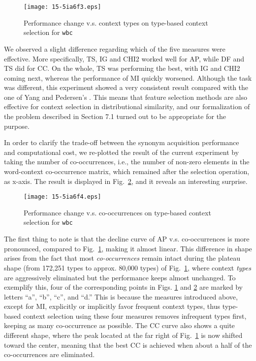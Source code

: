 \documentclass[english]{jnlp_1.4}
\begin{document}
\begin{figure}[b]
\begin{center}
\texttt{[image: 15-5ia6f3.eps]}
\end{center}
\caption{Performance change v.s. context types on type-based context selection for {\tt wbc}}
\label{fig_typeres_wbc}
\end{figure}

We observed a slight difference regarding which of the five measures
were effective. More specifically, TS, IG and CHI2 worked well for AP,
while DF and TS did for CC. On the whole, TS was performing the best,
with IG and CHI2 coming next, whereas the performance of MI quickly
worsened. Although the task was different, this experiment showed a
very consistent result compared with the one of Yang and Pedersen's
\cite{Yang:97}. This means that feature selection methods are also
effective for context selection in distributional similarity, and our
formalization of the problem described in Section 7.1 turned out to be
appropriate for the purpose.


In order to clarify the trade-off between the synonym acquisition
performance and computational cost, we re-plotted the result of the
current experiment by taking the number of co-occurrences, i.e., the
number of non-zero elements in the word-context co-occurrence matrix,
which remained after the selection operation, as x-axis. The result is
displayed in Fig.~\ref{fig_typeres2_wbc}, and it reveals an
interesting surprise.

\begin{figure}[b]
\begin{center}
\texttt{[image: 15-5ia6f4.eps]}
\end{center}
\caption{Performance change v.s. co-occurrences on type-based context selection for {\tt wbc}}
\label{fig_typeres2_wbc}
\end{figure}

The first thing to note is that the decline curve of AP
v.s. co-occurrences is more pronounced, compared to Fig.~\ref{fig_typeres_wbc}, 
making it almost linear. This difference in
shape arises from the fact that most {\em co-occurrences} remain
intact during the plateau shape (from 172,251 types to approx. 80,000
types) of Fig.~\ref{fig_typeres_wbc}, where context {\em types} are
aggressively eliminated but the performance keeps almost unchanged. To
exemplify this, four of the corresponding points in Figs.
\ref{fig_typeres_wbc} and \ref{fig_typeres2_wbc} are marked by letters
``a'', ``b'', ``c'', and ``d.''  This is because the measures
introduced above, except for MI, explicitly or implicitly favor
frequent context types, thus type-based context selection using these
four measures removes infrequent types first, keeping as many
co-occurrence as possible. The CC curve also shows a quite different
shape, where the peak located at the far right of
Fig.~\ref{fig_typeres_wbc} is now shifted toward the center, meaning
that the best CC is achieved when about a half of the co-occurrences
are eliminated.
\end{document}
